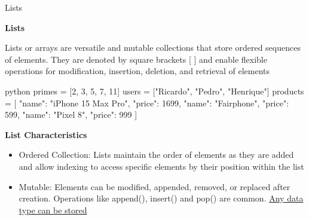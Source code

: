 \documentclass[
	11pt, 
]{beamer}
\begin{document}
\begin{frame}[fragile]{Lists}
\scriptsize
    
\begin{block}{\textbf{Lists}}
    
Lists or arrays are versatile and mutable collections that store ordered sequences of elements. They are denoted by square brackets [ ] and enable flexible operations for modification, insertion, deletion, and retrieval of elements

\end{block}
\begin{mintedbox}{python}
primes = [2, 3, 5, 7, 11]           
users = ["Ricardo", "Pedro", "Henrique"]
products = [        {"name": "iPhone 15 Max Pro", "price": 1699},
                    {"name": "Fairphone", "price": 599},
                    {"name": "Pixel 8", "price": 999}            ]  \end{mintedbox}

\begin{exampleblock}{\textbf{List Characteristics}}
    \begin{itemize}
        \item Ordered Collection: Lists maintain the order of elements as they are added and allow indexing to access specific elements by their position within the list
        \item Mutable: Elements can be modified, appended, removed, or replaced after creation. Operations like append(), insert() and pop() are common. \underline{Any data type can be stored}
    \end{itemize}    
\end{exampleblock}


\end{frame}



\end{document}
